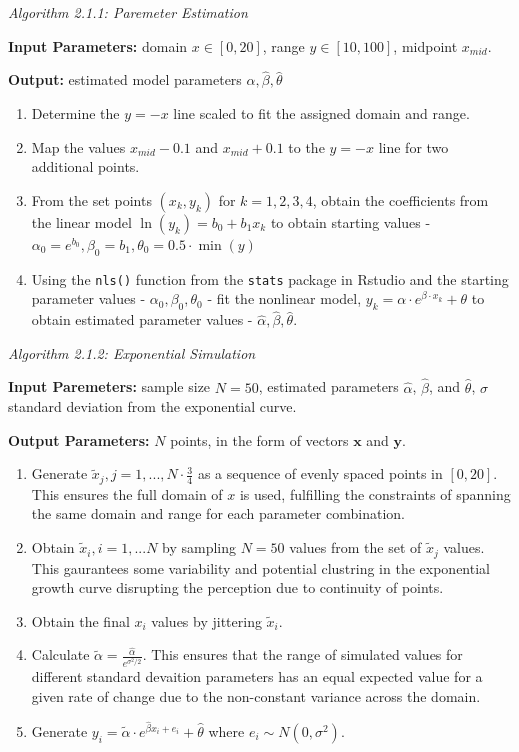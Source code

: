\documentclass[print]{nuthesis}
\providecommand{\tightlist}{%
  \setlength{\itemsep}{0pt}\setlength{\parskip}{0pt}}
\begin{document}
\noindent \textit{Algorithm 2.1.1: Paremeter Estimation}

\noindent \textbf{Input Parameters:} domain \(x\in[0,20]\), range \(y\in[10,100]\), midpoint \(x_{mid}\).

\noindent \textbf{Output:} estimated model parameters \(\hat\alpha, \hat\beta, \hat\theta\)

\begin{enumerate}
\def\labelenumi{\arabic{enumi}.}
\tightlist
\item
  Determine the \(y=-x\) line scaled to fit the assigned domain and range.
\item
  Map the values \(x_{mid} - 0.1\) and \(x_{mid} + 0.1\) to the \(y=-x\) line for two additional points.
\item
  From the set points \((x_k, y_k)\) for \(k = 1,2,3,4\), obtain the coefficients from the linear model \(\ln(y_k) = b_0 +b_1x_k\) to obtain starting values - \(\alpha_0 = e^{b_0}, \beta_0 = b_1, \theta_0 = 0.5\cdot \min(y)\)
\item
  Using the \texttt{nls()} function from the \texttt{stats} package in Rstudio and the starting parameter values - \(\alpha_0, \beta_0, \theta_0\) - fit the nonlinear model, \(y_k = \alpha\cdot e^{\beta\cdot x_k}+\theta\) to obtain estimated parameter values - \(\hat\alpha, \hat\beta, \hat\theta.\)
\end{enumerate}

\noindent\textit{Algorithm 2.1.2: Exponential Simulation}

\noindent \textbf{Input Paremeters:} sample size \(N = 50\), estimated parameters \(\hat\alpha\), \(\hat\beta\), and \(\hat\theta\), \(\sigma\) standard deviation from the exponential curve.

\noindent \textbf{Output Parameters:} \(N\) points, in the form of vectors \(\mathbf{x}\) and \(\mathbf{y}\).

\begin{enumerate}
\def\labelenumi{\arabic{enumi}.}
\tightlist
\item
  Generate \(\tilde x_j, j = 1,..., N\cdot \frac{3}{4}\) as a sequence of evenly spaced points in \([0,20]\). This ensures the full domain of \(x\) is used, fulfilling the constraints of spanning the same domain and range for each parameter combination.
\item
  Obtain \(\tilde x_i, i = 1,...N\) by sampling \(N = 50\) values from the set of \(\tilde x_j\) values. This gaurantees some variability and potential clustring in the exponential growth curve disrupting the perception due to continuity of points.
\item
  Obtain the final \(x_i\) values by jittering \(\tilde x_i\).
\item
  Calculate \(\tilde\alpha = \frac{\hat\alpha}{e^{\sigma^2/2}}.\) This ensures that the range of simulated values for different standard devaition parameters has an equal expected value for a given rate of change due to the non-constant variance across the domain.
\item
  Generate \(y_i = \tilde\alpha\cdot e^{\hat\beta x_i + e_i}+\hat\theta\) where \(e_i\sim N(0,\sigma^2).\)
\end{enumerate}
\end{document}
